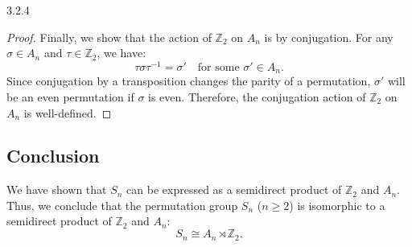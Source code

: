 \documentclass[12pt]{amsart}
\theoremstyle{definition}
\numberwithin{equation}{section}
\newcommand{\Z}{\mathbb{Z}}
\begin{document}
\begin{exercise}{3.2.4}
\begin{proof}
    Finally, we show that the action of \(\Z_2\) on \(A_n\) is by conjugation. For any \(\sigma \in A_n\) and \(\tau \in \Z_2\), we have:
    \[
    \tau \sigma \tau^{-1} = \sigma' \quad \text{for some } \sigma' \in A_n.
    \]
    Since conjugation by a transposition changes the parity of a permutation, \(\sigma'\) will be an even permutation if \(\sigma\) is even. Therefore, the conjugation action of \(\Z_2\) on \(A_n\) is well-defined.

    \end{proof}

    \subsection*{Conclusion}

    We have shown that \(S_n\) can be expressed as a semidirect product of \(\Z_2\) and \(A_n\). Thus, we conclude that the permutation group \(S_n\) (\(n \geq 2\)) is isomorphic to a semidirect product of \(\Z_2\) and \(A_n\):
    \[
    S_n \cong A_n \rtimes \Z_2.
    \]
    
\end{exercise}
\newpage
\end{document}
